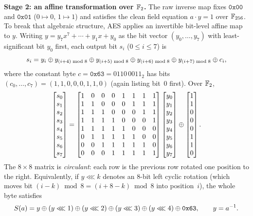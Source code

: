 \textbf{Stage 2: an affine transformation over $\mathbb{F}_2$.} The raw inverse map fixes
$\mathtt{0x00}$ and $\mathtt{0x01}$ ($0 \mapsto 0$, $1 \mapsto 1$) and satisfies
the clean field equation $a \cdot y = 1$ over $\mathbb{F}_{256}$. To break that algebraic
structure, AES applies an invertible bit-level affine map to $y$. Writing
$y = y_7 x^7 + \cdots + y_1 x + y_0$ as the bit vector $(y_0,\dots,y_7)$ with
least-significant bit $y_0$ first, each output bit $s_i$ ($0 \le i \le 7$) is
\[
s_i = y_i \oplus y_{(i+4)\bmod 8} \oplus y_{(i+5)\bmod 8} \oplus y_{(i+6)\bmod 8}
\oplus y_{(i+7)\bmod 8} \oplus c_i,
\]
where the constant byte $c = \mathtt{0x63} = 0110\,0011_2$ has bits
$(c_0,\dots,c_7) = (1,1,0,0,0,1,1,0)$ (again listing bit~$0$ first). Over $\mathbb{F}_2$,
\[
\begin{bmatrix} s_0 \\ s_1 \\ s_2 \\ s_3 \\ s_4 \\ s_5 \\ s_6 \\ s_7 \end{bmatrix}
=
\begin{bmatrix}
1&0&0&0&1&1&1&1\\
1&1&0&0&0&1&1&1\\
1&1&1&0&0&0&1&1\\
1&1&1&1&0&0&0&1\\
1&1&1&1&1&0&0&0\\
0&1&1&1&1&1&0&0\\
0&0&1&1&1&1&1&0\\
0&0&0&1&1&1&1&1
\end{bmatrix}
\begin{bmatrix} y_0 \\ y_1 \\ y_2 \\ y_3 \\ y_4 \\ y_5 \\ y_6 \\ y_7 \end{bmatrix}
\oplus
\begin{bmatrix} 1 \\ 1 \\ 0 \\ 0 \\ 0 \\ 1 \\ 1 \\ 0 \end{bmatrix}.
\]
The $8\times 8$ matrix is \emph{circulant}: each row is the previous row rotated
one position to the right. Equivalently, if $y \lll k$ denotes an $8$-bit left
cyclic rotation (which moves bit $(i-k) \bmod 8 = (i + 8 - k) \bmod 8$ into
position~$i$), the whole byte satisfies
\[
S(a) = y \oplus (y \lll 1) \oplus (y \lll 2) \oplus (y \lll 3) \oplus (y \lll 4) \oplus \mathtt{0x63},
\qquad y = a^{-1}.
\]

